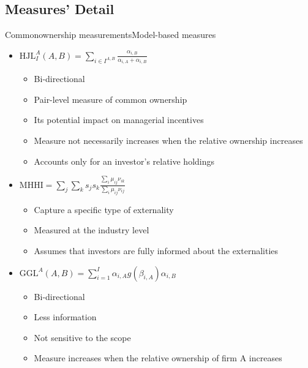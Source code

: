 \documentclass[handout]{beamer}
\begin{document}
	
	
	
	
	\subsection{Measures' Detail}
	\begin{frame}{Commonownership measurements}{Model-based measures }\label{measuredetail}
		
		\begin{itemize}
			\item \color{cyan} \scriptsize $
			\text{HJL}_I^A(A,B) = \sum_{i\in I^{A,B}}\frac{\alpha_{i,B}}{\alpha_{i,A} + \alpha_{i,B}}     $  \normalcolor
			\tiny \cite{harford2011institutional} \\ 
			\begin{itemize}
				\item Bi-directional
				\item Pair-level measure of common ownership
				\item Its potential impact on managerial incentives
				\item Measure not necessarily increases  when the relative ownership increases
				\item Accounts  only for an investor’s relative holdings
			\end{itemize}
			\normalsize
			\item \color{cyan} \scriptsize$   \text{MHHI} = \sum_{j} \sum_k s_j s_k \frac{\sum_i \mu_{ij} \nu_{ik}}{\sum_i \mu_{ij} \nu_{ij}}   $ \tiny   \normalcolor
			\cite{azar2018anticompetitive}  \\ 
			\begin{itemize}
				\item Capture a specific   type of externality
				\item Measured at the industry level
				\item Assumes that investors are fully   informed about the externalities 
			\end{itemize}
			\normalsize
			
			\item \color{cyan} \scriptsize$   \text{GGL}^A(A,B) = \sum_{i = 1}^{I} \alpha_{i,A}g(\beta_{i,A})\alpha_{i,B}   $ \tiny \normalcolor 
			\cite{gilje2020s}
			\\ 
			\begin{itemize}
				\item Bi-directional
				\item Less information
				\item Not sensitive to  the scope
				\item Measure increases   when the relative ownership of firm A increases
			\end{itemize}
			\normalsize
		\end{itemize}
		
		
	\end{frame}
	
\end{document}
